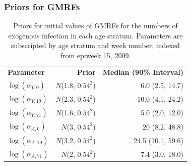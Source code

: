 \subsubsection{Priors for GMRFs}
\label{subsubsec:flu_gmrf_priors}

\begin{table}
	\caption[Priors for initial values of GMRFs for the numbers of exogenous infection in each age stratum.]{Priors for initial values of GMRFs for the numbers of exogenous infection in each age stratum. Parameters are subscripted by age stratum and week number, indexed from epiweek 15, 2009.}
	\label{tab:flu_alpha_gmrf_initpriors}
	\centering
	\begin{tabular}{lrr}
		\hline
		\textbf{Parameter} & \textbf{Prior} & \textbf{Median (90\% Interval)} \\ 
		$ \log(\alpha_{Y,0}) $ & $ N $(1.8, $ 0.54^2 $) & 6.0 (2.5, 14.7) \\ 
		$ \log(\alpha_{Y,19}) $ & $ N $(2.3, $ 0.54^2 $) & 10.0 (4.1, 24.2) \\
		$ \log(\alpha_{Y,71}) $ & $ N $(1.6, $ 0.54^2 $) & 5.0 (2.0, 12.0) \\
		$ \log(\alpha_{A,0}) $ & $ N $(3, $ 0.54^2 $) & 20 (8.2, 48.8) \\ 
		$ \log(\alpha_{A,19}) $ & $ N $(3.2, $ 0.54^2 $) & 24.5 (10.1, 59.6) \\
		$ \log(\alpha_{A,71}) $ & $ N $(2, $ 0.54^2 $) & 7.4 (3.0, 18.0) \\
		\hline
	\end{tabular}
\end{table}

